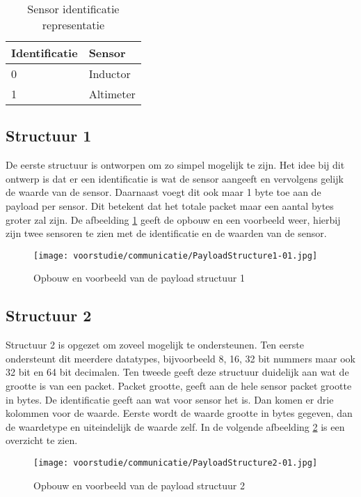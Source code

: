 \begin{table}[h!]
	\centering
	\caption{Sensor identificatie representatie}
	\label{tab:SensorRep}
	\begin{tabular}{p{4cm}p{6cm}}
	\toprule
	Identificatie & Sensor        \\ \midrule
	0      & Inductor  \\
	1      & Altimeter \\ \bottomrule
	\end{tabular}%
\end{table}

\subsection{Structuur 1}
De eerste structuur is ontworpen om zo simpel mogelijk te zijn. Het idee bij dit ontwerp is dat er een identificatie is wat de sensor aangeeft en vervolgens gelijk de waarde van de sensor. Daarnaast voegt dit ook maar 1 byte toe aan de payload per sensor. Dit betekent dat het totale packet maar een aantal bytes groter zal zijn. De afbeelding \ref{fig:Structure1} geeft de opbouw en een voorbeeld weer, hierbij zijn twee sensoren te zien met de identificatie en de waarden van de sensor.
\begin{figure}[h!]
	\centering
	\label{fig:Structure1}


	\texttt{[image: voorstudie/communicatie/PayloadStructure1-01.jpg]}
	\caption{Opbouw en voorbeeld van de payload structuur 1}
\end{figure}

\newpage
\subsection{Structuur 2}
Structuur 2 is opgezet om zoveel mogelijk te ondersteunen. Ten eerste ondersteunt dit meerdere datatypes, bijvoorbeeld 8, 16, 32 bit nummers maar ook 32 bit en 64 bit decimalen. Ten tweede geeft deze structuur duidelijk aan wat de grootte is van een packet. Packet grootte, geeft aan de hele sensor packet grootte in bytes. De identificatie geeft aan wat voor sensor het is. Dan komen er drie kolommen voor de waarde. Eerste wordt de waarde grootte in bytes gegeven, dan de waardetype en uiteindelijk de waarde zelf. In de volgende afbeelding \ref{fig:Structure2} is een overzicht te zien.
\begin{figure}[h!]
	\centering
	\label{fig:Structure2}

	\texttt{[image: voorstudie/communicatie/PayloadStructure2-01.jpg]}
	\caption{Opbouw en voorbeeld van de payload structuur 2}
\end{figure}


